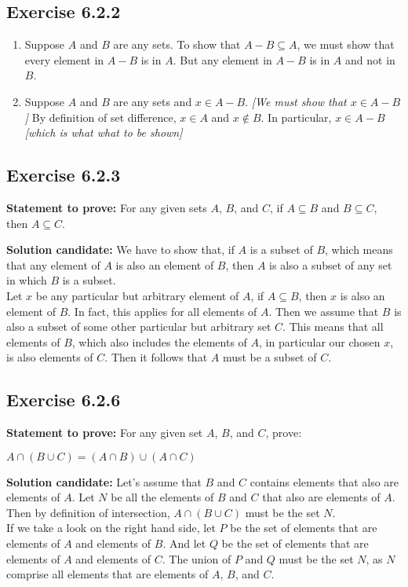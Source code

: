 \documentclass{report}
\newcommand{\cent}[1]{\begin{center}#1\end{center}}
\newcommand{\In}{\! \in \!}
\newcommand{\Prove}{\textbf{Statement to prove: }}
\newcommand{\Solution}{\textbf{Solution candidate: }}
\newcommand{\QED}{\boxed{}}
\newcommand{\Exercise}[1]{\subsection{Exercise #1}}
\newcommand{\defaultEnumerateLabel}{\textbf{\alph*.}}
\begin{document}
	\Exercise{6.2.2}
	
	\begin{enumerate}[label=\defaultEnumerateLabel]
		\item Suppose $A$ and $B$ are any sets. To show that $A-B \subseteq A$, we must show that every element in $A-B$ is in $A$. But any element in $A-B$ is in $A$ and not in $B$.
		
		\item Suppose $A$ and $B$ are any sets and $x\In A-B$. \textit{[We must show that $x \In A-B$]} By definition of set difference, $x \In A$ and $x \notin B$. In particular, $x \In A - B$ \textit{[which is what what to be shown]}
	\end{enumerate}

	\Exercise{6.2.3}
	
	\Prove
	For any given sets $A$, $B$, and $C$, if $A \subseteq B$ and $B \subseteq C$, then $A \subseteq C$. 
	
	\Solution
	We have to show that, if $A$ is a subset of  $B$, which means that any element of $A$ is also an element of $B$, then $A$ is also a subset of any set in which $B$ is a subset.\\
	
	Let $x$ be any particular but arbitrary element of $A$, if $A \subseteq B$, then $x$ is also an element of $B$.  In fact, this applies for all elements of $A$. Then we assume that $B$ is also a subset of some other particular but arbitrary set $C$. This means that all elements of $B$, which also includes the elements of $A$, in particular our chosen $x$, is also elements of $C$. Then it follows that $A$ must be a subset of $C$.\\
	\QED 
	
	\Exercise{6.2.6}
	
	\Prove
	For any given set $A$, $B$, and $C$, prove:
	
	\cent{$A \cap (B \cup C) = (A \cap B) \cup (A \cap C)$}
	
	\Solution
	Let's assume that $B$ and $C$ contains elements that also are elements of $A$. Let $N$ be all the elements of $B$ and $C$ that also are elements of $A$. Then by definition of intersection, $A \cap (B \cup C)$  must be the set $N$.\\
	
	If we take a look on the right hand side, let $P$ be the set of elements that are elements of $A$ and elements of $B$. And let $Q$ be the set of elements that are elements of $A$ and elements of $C$. The union of $P$ and $Q$ must be the set $N$, as $N$ comprise all elements that are elements of $A$, $B$, and $C$.\\
	\QED
	
\end{document}
